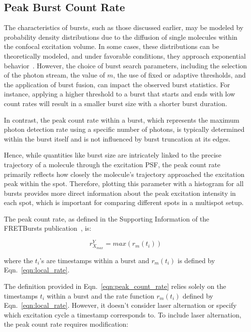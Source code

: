 \subsection{Peak Burst Count Rate}
\label{sec:peak_count_rate_apdx}

The characteristics of bursts, such as those discussed earlier, may be modeled by probability density distributions due to the diffusion of single molecules within the confocal excitation volume. 
In some cases, these distributions can be theoretically modeled, and under favorable conditions, they approach exponential behavior~\cite{gopich_JCP_2006}. 
However, the choice of burst search parameters, including the selection of the photon stream, the value of $m$, the use of fixed or adaptive thresholds, and the application of burst fusion, can impact the observed burst statistics. 
For instance, applying a higher threshold to a burst that starts and ends with low count rates will result in a smaller burst size with a shorter burst duration.

In contrast, the peak count rate within a burst, which represents the maximum photon detection rate using a specific number of photons, is typically determined within the burst itself and is not influenced by burst truncation at its edges.

Hence, while quantities like burst size are intricately linked to the precise trajectory of a molecule through the excitation \ac{PSF}, the peak count rate primarily reflects how closely the molecule's trajectory approached the excitation peak within the spot. 
Therefore, plotting this parameter with a histogram for all bursts provides more direct information about the peak excitation intensity in each spot, which is important for comparing different spots in a multispot setup.

The peak count rate, as defined in the Supporting Information of the FRETBursts publication~\cite{ingargiola_PLOS1_2016}, is:

\begin{equation}
\label{eqn:peak_count_rate}
r^{Y}_{X_{max}} = max(r_m(t_i))
\end{equation}

\noindent
where the $t_i$'s are timestamps within a burst and $r_m(t_i)$ 
is defined by Eqn.~\ref{eqn:local_rate}.

The definition provided in Eqn.~\ref{eqn:peak_count_rate} relies solely on the timestamps $t_i$ within a burst and the rate function $r_m(t_i)$ defined by Eqn.~\ref{eqn:local_rate}. 
However, it doesn't consider laser alternation or specify which excitation cycle a timestamp corresponds to. 
To include laser alternation, the peak count rate requires modification:

